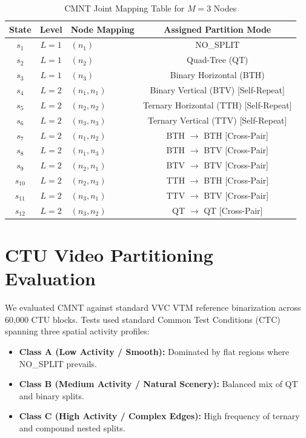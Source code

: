 \documentclass[conference]{IEEEtran}
\begin{document}
\begin{table}[htbp]
\caption{CMNT Joint Mapping Table for $M = 3$ Nodes}
\begin{center}
\begin{tabular}{cclc}
\toprule
\textbf{State} & \textbf{Level} & \textbf{Node Mapping} & \textbf{Assigned Partition Mode} \\
\midrule
$s_1$  & $L=1$ & $(n_1)$ & NO\_SPLIT \\
$s_2$  & $L=1$ & $(n_2)$ & Quad-Tree (QT) \\
$s_3$  & $L=1$ & $(n_3)$ & Binary Horizontal (BTH) \\
$s_4$  & $L=2$ & $(n_1, n_1)$ & Binary Vertical (BTV) [Self-Repeat] \\
$s_5$  & $L=2$ & $(n_2, n_2)$ & Ternary Horizontal (TTH) [Self-Repeat] \\
$s_6$  & $L=2$ & $(n_3, n_3)$ & Ternary Vertical (TTV) [Self-Repeat] \\
$s_7$  & $L=2$ & $(n_1, n_2)$ & BTH $\to$ BTH [Cross-Pair] \\
$s_8$  & $L=2$ & $(n_1, n_3)$ & BTH $\to$ BTV [Cross-Pair] \\
$s_9$  & $L=2$ & $(n_2, n_1)$ & BTV $\to$ BTV [Cross-Pair] \\
$s_{10}$ & $L=2$ & $(n_2, n_3)$ & TTH $\to$ BTH [Cross-Pair] \\
$s_{11}$ & $L=2$ & $(n_3, n_1)$ & TTV $\to$ BTV [Cross-Pair] \\
$s_{12}$ & $L=2$ & $(n_3, n_2)$ & QT $\to$ QT [Cross-Pair] \\
\bottomrule
\end{tabular}
\end{center}
\end{table}

\section{CTU Video Partitioning Evaluation}
We evaluated CMNT against standard VVC VTM reference binarization across 60,000 CTU blocks. Tests used standard Common Test Conditions (CTC) spanning three spatial activity profiles:
\begin{itemize}
    \item \textbf{Class A (Low Activity / Smooth):} Dominated by flat regions where NO\_SPLIT prevails.
    \item \textbf{Class B (Medium Activity / Natural Scenery):} Balanced mix of QT and binary splits.
    \item \textbf{Class C (High Activity / Complex Edges):} High frequency of ternary and compound nested splits.
\end{itemize}
\end{document}
